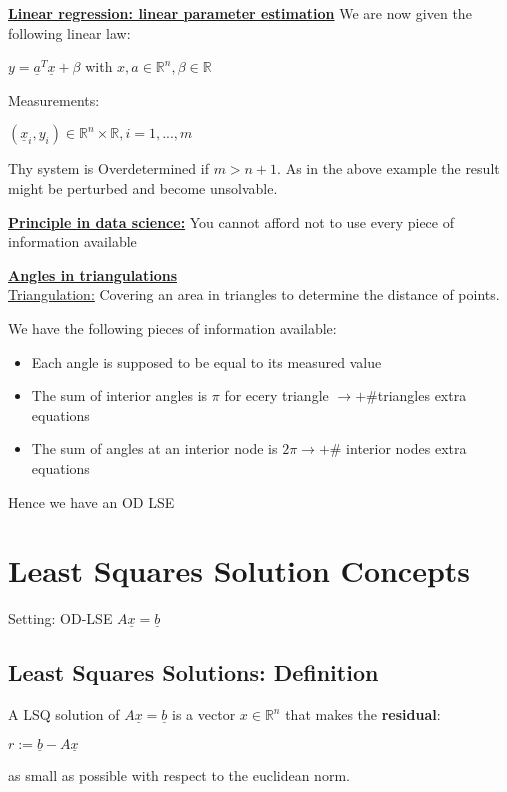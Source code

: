 \documentclass[8pt]{extreport}
\begin{document}
\underline{\textbf{Linear regression: linear parameter estimation}} We are now given the following linear law:
\begin{center}
$y = \underline{a}^T\underline{x} + \beta$ with $x,a \in \mathbb{R}^n, \beta \in \mathbb{R} $
\end{center}
Measurements:
\begin{center}
$(\underline{x}_i,y_i) \in \mathbb{R}^n \times \mathbb{R}, i=1,...,m$
\end{center}
Thy system is Overdetermined if $m > n+1$. As in the above example the result might be perturbed and become unsolvable.

\underline{\textbf{Principle in data science:}} You cannot afford not to use every piece of information available

\underline{\textbf{Angles in triangulations}}\\

\underline{Triangulation:} Covering an area in triangles to determine the distance of points.

We have the following pieces of information available:
\begin{itemize}
\item Each angle is supposed to be equal to its measured value
\item The sum of interior angles is $\pi$ for ecery triangle $\rightarrow +\#$triangles extra equations
\item The sum of angles at an interior node is $2\pi \rightarrow + \#$ interior nodes extra equations
\end{itemize}
Hence we have an OD LSE

\section{Least Squares Solution Concepts}

Setting: OD-LSE $A\underline{x} = \underline{b}$

\subsection{Least Squares Solutions: Definition}

A LSQ solution of $A\underline{x} = \underline{b}$ is a vector $x \in \mathbb{R}^n$ that makes the \textbf{residual}:
\begin{center}
$r:= \underline{b} - A\underline{x}$
\end{center}
as small as possible with respect to the euclidean norm.
\end{document}
